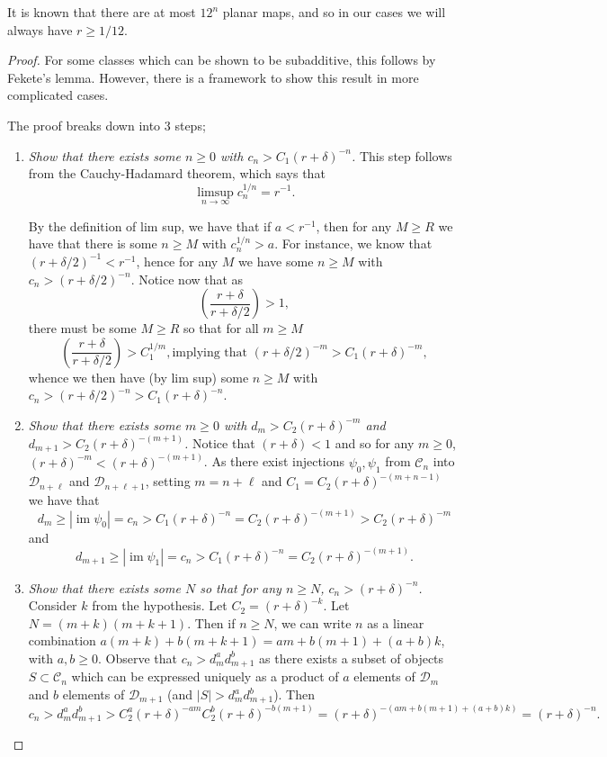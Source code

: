 \documentclass[amsmath,longbibliography,secnumarabic,floatfix,amssymb,nofootinbib,nobibnotes,letterpaper,11pt,tightenlines,notitlepage,showkeys,showlabels]{amsart}%
\newcommand{\ArbClass}{\mathscr{C}}
\newcommand{\ArbSubClass}{\mathscr{D}}
\newcommand{\arbsubclass}{d}
\newcommand{\arbclass}{c}
\DeclareMathOperator{\im}{im}
\theoremstyle{definition}
\begin{document}
It is known that there are at most $12^n$ planar maps, and so in our cases we will always have $r
\ge 1/12$.

\begin{proof}
  For some classes which can be shown to be subadditive, this follows
  by Fekete's lemma. However, there is a framework to show this result
  in more complicated cases.

The proof breaks down into 3 steps;
\begin{enumerate}
\item \emph{Show that there exists some $n \ge 0$ with $\arbclass_n > C_1(r + \delta)^{-n}$.} This
  step follows from the Cauchy-Hadamard theorem, which says that
  \[ \limsup_{n\to\infty}{\arbclass_n^{1/n}} = r^{-1}. \]

  By the definition of lim sup, we have that if $a < r^{-1}$, then for
  any $M \ge R$ we have that there is some $n \ge M$ with
  $\arbclass_n^{1/n} > a$. For instance, we know that $(r +
  \delta/2)^{-1} < r^{-1}$, hence for any $M$ we have some $n \ge M$
  with $\arbclass_n > (r+\delta/2)^{-n}$. Notice now that as
  \[ \left( \frac{r+\delta}{r + \delta/2} \right) > 1, \] there must
  be some $M \ge R$ so that for all $m \ge M$
  \[ \left( \frac{r+\delta}{r + \delta/2} \right) > C_1^{1/m}, \text{
    implying that } (r + \delta/2)^{-m} > C_1(r + \delta)^{-m}, \]
  whence we then have (by lim sup) some $n \ge M$ with $c_n >
  (r+\delta/2)^{-n} > C_1(r+\delta)^{-n}$.
\item \emph{Show that there exists some $m \ge 0$ with $\arbsubclass_m
    > C_2(r + \delta)^{-m}$ and $\arbsubclass_{m+1} > C_2(r +
    \delta)^{-(m+1)}$.} Notice that $(r + \delta) < 1$ and so for any
  $m \ge 0$, $(r + \delta)^{-m} < (r+\delta)^{-(m+1 )}$. As there
  exist injections $\psi_0, \psi_1$ from $\ArbClass_n$ into
  $\ArbSubClass_{n+\ell}$ and $\ArbSubClass_{n+\ell+1}$, setting $m =
  n + \ell$ and $C_1 = C_2(r+\delta)^{-(m+n-1)}$ we have that
  \[ \arbsubclass_m \ge |\im \psi_0| = \arbclass_n >
  C_1(r+\delta)^{-n} = C_2(r+\delta)^{-(m+1)} > C_2(r+\delta)^{-m} \]
  and
  \[ \arbsubclass_{m+1} \ge |\im \psi_1| = \arbclass_n > C_1(r+\delta)^{-n} =
  C_2(r+\delta)^{-(m+1)}. \]
\item \emph{Show that there exists some $N$ so that for any $n \ge N$,
    $\arbclass_n > (r + \delta)^{-n}$.} Consider $k$ from the
  hypothesis. Let $C_2 = (r + \delta)^{-k}$. Let $N = (m + k)(m + k +
  1)$. Then if $n \ge N$, we can write $n$ as a linear combination
  $a(m + k) + b(m + k + 1) = am + b(m + 1) + (a+b)k$, with $a, b \ge
  0$. Observe that $c_n > \arbsubclass_m^a\arbsubclass_{m+1}^b$ as
  there exists a subset of objects $S \subset \ArbClass_n$ which can
  be expressed uniquely as a product of $a$ elements of
  $\ArbSubClass_m$ and $b$ elements of $\ArbSubClass_{m+1}$ (and $|S|
  > \arbsubclass_m^a\arbsubclass_{m+1}^b$). Then
  \[ c_n > d_m^ad_{m+1}^b > C_2^a(r+\delta)^{-am}C_2^b(r+\delta)^{-b(m+1)} = (r+\delta)^{-(am +b(m+1)+(a+b)k)} = (r+\delta)^{-n}.\]
\end{enumerate}


\end{proof}
\end{document}
